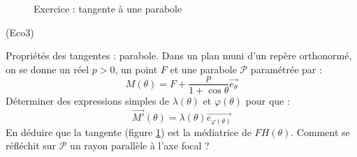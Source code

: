 \begin{figure}[htp]
 \centering
 
 \caption{Exercice  : tangente à une parabole}
 \label{fig:Eco3_1}
\end{figure}
\begin{tiny}(Eco3)\end{tiny} Propriétés des tangentes : parabole.\newline
Dans un plan muni d'un repère orthonormé, on se donne un réel $p>0$, un point $F$ et une parabole $\mathcal P$ paramétrée par :
\begin{displaymath}
 M(\theta) = F + \frac{p}{1+ \cos\theta}\overrightarrow{e_\theta}
\end{displaymath}
Déterminer des expressions simples de $\lambda(\theta)$ et $\varphi(\theta)$ pour que :
\begin{displaymath}
 \overrightarrow{M'}(\theta) = \lambda(\theta)\overrightarrow{e_{\varphi(\theta)}}
\end{displaymath}
En déduire que la tangente (figure \ref{fig:Eco3_1}) est la médiatrice de $FH(\theta)$. Comment se réfléchit sur $\mathcal P$ un rayon parallèle à l'axe focal ?